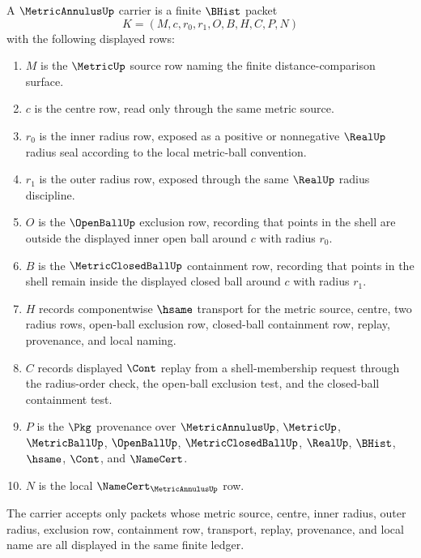 \begin{definition}
\label{def:metric-annulus-carrier}
A $\MetricAnnulusUp$ carrier is a finite $\BHist$ packet
$$
K=(M,c,r_0,r_1,O,B,H,C,P,N)
$$
with the following displayed rows:
\begin{enumerate}
\item $M$ is the $\MetricUp$ source row naming the finite distance-comparison surface.
\item $c$ is the centre row, read only through the same metric source.
\item $r_0$ is the inner radius row, exposed as a positive or nonnegative $\RealUp$ radius seal according to the local metric-ball convention.
\item $r_1$ is the outer radius row, exposed through the same $\RealUp$ radius discipline.
\item $O$ is the $\OpenBallUp$ exclusion row, recording that points in the shell are outside the displayed inner open ball around $c$ with radius $r_0$.
\item $B$ is the $\MetricClosedBallUp$ containment row, recording that points in the shell remain inside the displayed closed ball around $c$ with radius $r_1$.
\item $H$ records componentwise $\hsame$ transport for the metric source, centre, two radius rows, open-ball exclusion row, closed-ball containment row, replay, provenance, and local naming.
\item $C$ records displayed $\Cont$ replay from a shell-membership request through the radius-order check, the open-ball exclusion test, and the closed-ball containment test.
\item $P$ is the $\Pkg$ provenance over $\MetricAnnulusUp$, $\MetricUp$, $\MetricBallUp$, $\OpenBallUp$, $\MetricClosedBallUp$, $\RealUp$, $\BHist$, $\hsame$, $\Cont$, and $\NameCert$.
\item $N$ is the local $\NameCert_{\MetricAnnulusUp}$ row.
\end{enumerate}
The carrier accepts only packets whose metric source, centre, inner radius, outer radius, exclusion row, containment row, transport, replay, provenance, and local name are all displayed in the same finite ledger.
\end{definition}

